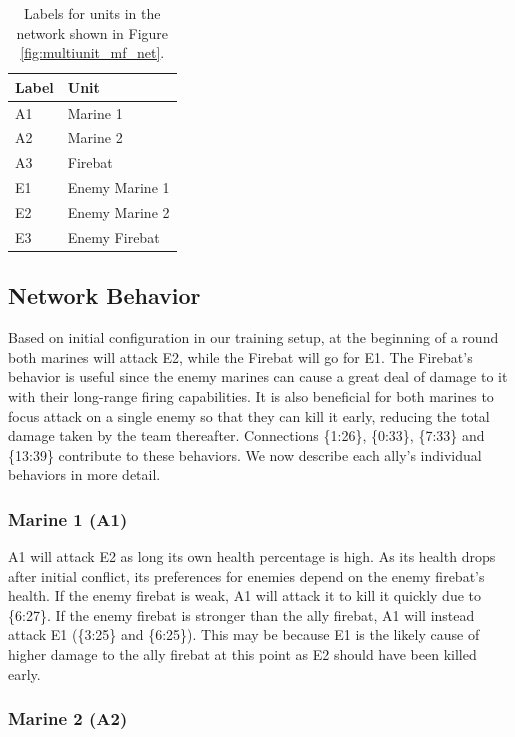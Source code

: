 \documentclass[10pt,a4paper,twocolumn]{article}
\begin{document}
\begin{table}
\centering
\begin{tabular}{|l|l|}
	\hline
	{\bf Label} & {\bf Unit} \\ \hline
	A1 & Marine 1 \\ \hline
	A2 & Marine 2 \\ \hline
	A3 & Firebat \\ \hline
	E1 & Enemy Marine 1 \\ \hline
	E2 & Enemy Marine 2 \\ \hline
	E3 & Enemy Firebat \\ \hline
\end{tabular}
\caption{Labels for units in the network shown in Figure \ref{fig:multiunit_mf_net}.}
\label{tab:multiunit_labels}
\end{table}

\subsection{Network Behavior}
\label{sec:network_behavior}

Based on initial configuration in our training setup, at the beginning of a round both marines will attack E2, while the Firebat will go for E1. The Firebat's behavior is useful since the enemy marines can cause a great deal of damage to it with their long-range firing capabilities. It is also beneficial for both marines to focus attack on a single enemy so that they can kill it early, reducing the total damage taken by the team thereafter. Connections \{1:26\}, \{0:33\}, \{7:33\} and \{13:39\} contribute to these behaviors. We now describe each ally's individual behaviors in more detail.

\subsubsection{Marine 1 (A1)}
\label{sec:network_out_a1}

A1 will attack E2 as long its own health percentage is high. As its health drops after initial conflict, its preferences for enemies depend on the enemy firebat's health. If the enemy firebat is weak, A1 will attack it to kill it quickly due to \{6:27\}. If the enemy firebat is stronger than the ally firebat, A1 will instead attack E1 (\{3:25\} and \{6:25\}). This may be because E1 is the likely cause of higher damage to the ally firebat at this point as E2 should have been killed early.

\subsubsection{Marine 2 (A2)}
\end{document}
